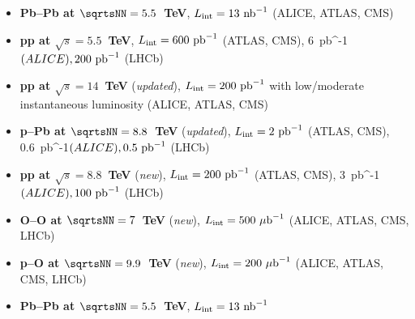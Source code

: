 \documentclass[../report.tex]{subfiles}
\begin{document}
\begin{itemize}

\item {\bf Pb--Pb at $\sqrtsNN=5.5$~TeV}, $L_{\rm int}=13~{\rm nb}^{-1}$ (ALICE, ATLAS, CMS)

\item {\bf pp at $\sqrt s=5.5$~TeV}, $L_{\rm int}=600~{\rm pb}^{-1}$ (ATLAS, CMS), 6~{\rm pb}^{-1}$ (ALICE),  200~{\rm pb}^{-1}$ (LHCb) 

\item {\bf pp at $\sqrt s=14$~TeV} ({\it updated}), $L_{\rm int}=200~{\rm pb}^{-1}$ with low/moderate instantaneous luminosity (ALICE, ATLAS, CMS)

\item {\bf p--Pb at $\sqrtsNN=8.8$~TeV}  ({\it updated}), $L_{\rm int}=2~{\rm pb}^{-1}$ (ATLAS, CMS), 0.6~{\rm pb}^{-1}$ (ALICE),  0.5~{\rm pb}^{-1}$ (LHCb) 

\item {\bf pp at $\sqrt s=8.8$~TeV}  ({\it new}), $L_{\rm int}=200~{\rm pb}^{-1}$ (ATLAS, CMS), 3~{\rm pb}^{-1}$ (ALICE),  100~{\rm pb}^{-1}$ (LHCb) 

\item {\bf O--O at $\sqrtsNN=7$~TeV} ({\it new}), $L_{\rm int}=500~{\rm \mu b}^{-1}$ (ALICE, ATLAS, CMS, LHCb)

\item {\bf p--O at $\sqrtsNN=9.9$~TeV} ({\it new}), $L_{\rm int}=200~{\rm \mu b}^{-1}$ (ALICE, ATLAS, CMS, LHCb)

\item {\bf Pb--Pb at $\sqrtsNN=5.5$~TeV}, $L_{\rm int}=13~{\rm nb}^{-1}$

\end{itemize}
\end{document}
